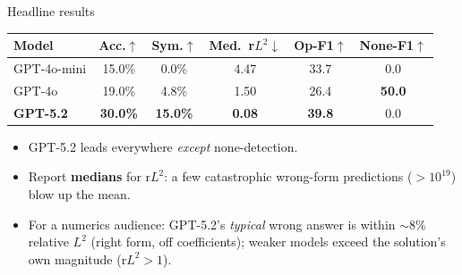 \documentclass[10pt,aspectratio=169]{beamer}
\begin{document}
\begin{frame}{Headline results}
  \small
  \begin{center}
  \begin{tabular}{@{}lccccc@{}}
    \toprule
    \textbf{Model} & \textbf{Acc.}$\uparrow$ & \textbf{Sym.}$\uparrow$ &
    \textbf{Med.\ r$L^2$}$\downarrow$ & \textbf{Op-F1}$\uparrow$ & \textbf{None-F1}$\uparrow$ \\
    \midrule
    GPT-4o-mini & 15.0\% & 0.0\% & 4.47 & 33.7 & 0.0 \\
    GPT-4o      & 19.0\% & 4.8\% & 1.50 & 26.4 & \textbf{50.0} \\
    \textbf{GPT-5.2} & \textbf{30.0\%} & \textbf{15.0\%} & \textbf{0.08} & \textbf{39.8} & 0.0 \\
    \bottomrule
  \end{tabular}
  \end{center}
  \vspace{4pt}
  \begin{itemize}
    \item GPT-5.2 leads everywhere \emph{except} none-detection.
    \item Report \textbf{medians} for r$L^2$: a few catastrophic wrong-form predictions
          ($>10^{19}$) blow up the mean.
    \item For a numerics audience: GPT-5.2's \emph{typical} wrong answer is within $\sim$8\% relative
          $L^2$ (right form, off coefficients); weaker models exceed the solution's own magnitude
          (r$L^2>1$).
  \end{itemize}
\end{frame}
\end{document}
